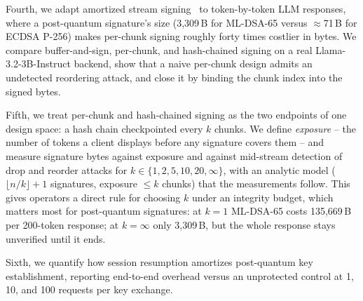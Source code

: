 \providecommand{\NUM}[1]{\textbf{[#1]}}

Fourth, we adapt amortized stream signing~\cite{gennaro1997streams,wong1999flows,perrig2000tesla}
to token-by-token LLM responses, where a post-quantum signature's size (3,309\,B for ML-DSA-65
versus $\approx$71\,B for ECDSA P-256) makes per-chunk signing roughly forty times costlier in bytes.
We compare buffer-and-sign, per-chunk, and hash-chained signing on a real
Llama-3.2-3B-Instruct backend, show that a naive per-chunk design admits an undetected
reordering attack, and close it by binding the chunk index into the signed bytes.

Fifth, we treat per-chunk and hash-chained signing as the two endpoints of one design space:
a hash chain checkpointed every $k$ chunks. We define \emph{exposure} -- the number of tokens a
client displays before any signature covers them -- and measure signature bytes against exposure
and against mid-stream detection of drop and reorder attacks for $k\in\{1,2,5,10,20,\infty\}$,
with an analytic model ($\lfloor n/k\rfloor+1$ signatures, exposure $\le k$ chunks) that the
measurements follow. This gives operators a direct rule for choosing $k$ under an integrity
budget, which matters most for post-quantum signatures: at $k=1$ ML-DSA-65 costs 135,669\,B per
200-token response; at $k=\infty$ only 3,309\,B, but the whole response stays unverified until it ends.

Sixth, we quantify how session resumption amortizes post-quantum key establishment, reporting
end-to-end overhead versus an unprotected control at 1, 10, and 100 requests per key exchange.

